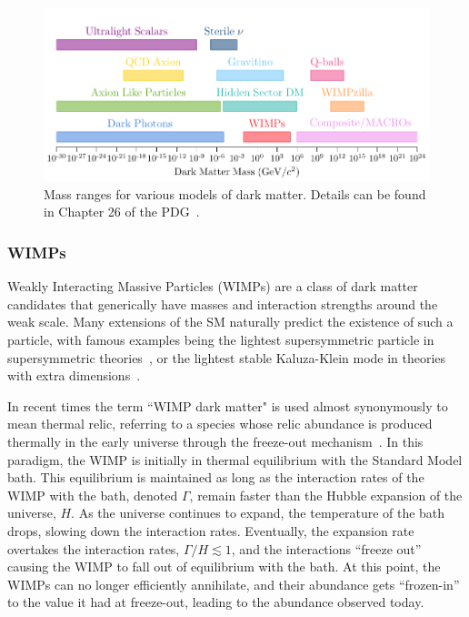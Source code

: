 \begin{figure}[t!]
    \centering
    \includegraphics{DM_model_landscape}
    \caption[Mass ranges for various models of dark matter.]{Mass ranges for various models of dark matter. Details can be found in Chapter 26 of the PDG~\cite{ParticleDataGroup:2022pth_aug_ReviewParticlePhysics}.}
    \label{ch1:fig:DM_models_landscape}
\end{figure}

\subsubsection*{WIMPs}
Weakly Interacting Massive Particles (WIMPs) are a class of dark matter candidates that generically have masses and interaction strengths around the weak scale. Many extensions of the SM naturally predict the existence of such a particle, with famous examples being the lightest supersymmetric particle in supersymmetric theories~\cite{Goldberg:1983nd_ConstraintPhotinoMass}, or the lightest stable Kaluza-Klein mode in theories with extra dimensions~\cite{Kolb:1983fm_DimensionalReductionEarly}. 

In recent times the term ``WIMP dark matter" is used almost synonymously to mean thermal relic, referring to a species whose relic abundance is produced thermally in the early universe through the freeze-out mechanism~\cite{Jungman:1995df_Supersymmetricdarkmatter}.
In this paradigm, the WIMP is initially in thermal equilibrium with the Standard Model bath. This equilibrium is maintained as long as the interaction rates of the WIMP with the bath, denoted $\Gamma$, remain faster than the Hubble expansion of the universe, $H$. As the universe continues to expand, the temperature of the bath drops, slowing down the interaction rates. Eventually, the expansion rate overtakes the interaction rates, $\Gamma/H\lesssim 1$, and the interactions ``freeze out'' causing the WIMP to fall out of equilibrium with the bath. At this point, the WIMPs can no longer efficiently annihilate, and their abundance gets ``frozen-in'' to the value it had at freeze-out, leading to the abundance observed today. 



